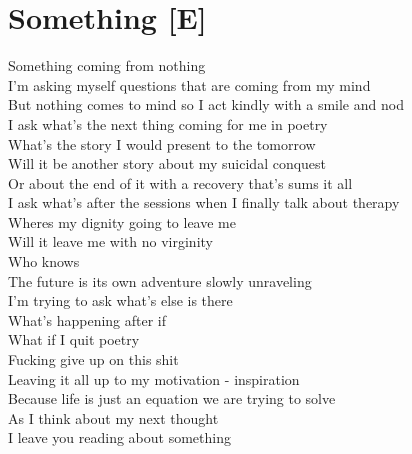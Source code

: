\documentclass[12pt, b5paper, oneside]{book}
\begin{document}
\section{Something [E]}
Something coming from nothing
\\I'm asking myself questions that are coming from my mind
\\But nothing comes to mind so I act kindly with a smile and nod
\\I ask what's the next thing coming for me in poetry
\\What's the story I would present to the tomorrow
\\Will it be another story about my suicidal conquest
\\Or about the end of it with a recovery that's sums it all
\\I ask what's after the sessions when I finally talk about therapy
\\Wheres my dignity going to leave me
\\Will it leave me with no virginity
\\Who knows
\\The future is its own adventure slowly unraveling
\\I'm trying to ask what's else is there
\\What's happening after if
\\What if I quit poetry
\\Fucking give up on this shit
\\Leaving it all up to my motivation - inspiration
\\Because life is just an equation we are trying to solve
\\As I think about my next thought
\\I leave you reading about something 
\newpage
\end{document}
